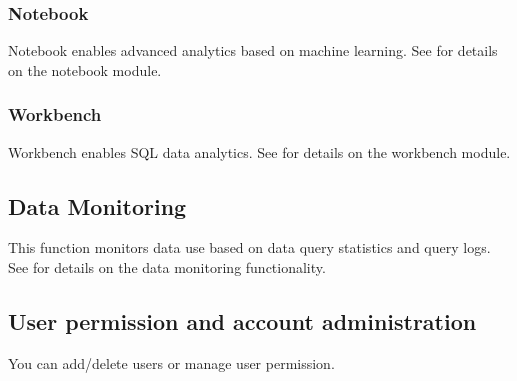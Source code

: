 \documentclass[letterpaper,10pt,english]{sphinxmanual}
\begin{document}
\subsubsection{Notebook}
\label{\detokenize{discovery/part01/structure:id6}}
Notebook enables advanced analytics based on machine learning. See {\hyperref[\detokenize{discovery/part05/index::doc}]{}} for details on the notebook module.
\begin{quote}

\begin{figure}[H]
\centering

\noindent{}
\end{figure}
\end{quote}


\subsubsection{Workbench}
\label{\detokenize{discovery/part01/structure:id7}}
Workbench enables SQL data analytics. See {\hyperref[\detokenize{discovery/part06/index::doc}]{}} for details on the workbench module.
\begin{quote}

\begin{figure}[H]
\centering

\noindent{}
\end{figure}
\end{quote}


\subsection{Data Monitoring}
\label{\detokenize{discovery/part01/structure:id8}}
This function monitors data use based on data query statistics and query logs. See {\hyperref[\detokenize{discovery/part02/data_monitoring::doc}]{}} for details on the data monitoring functionality.
\begin{quote}

\begin{figure}[H]
\centering

\noindent{}
\end{figure}
\end{quote}


\subsection{User permission and account administration}
\label{\detokenize{discovery/part01/structure:id9}}
You can add/delete users or manage user permission.
\end{document}

